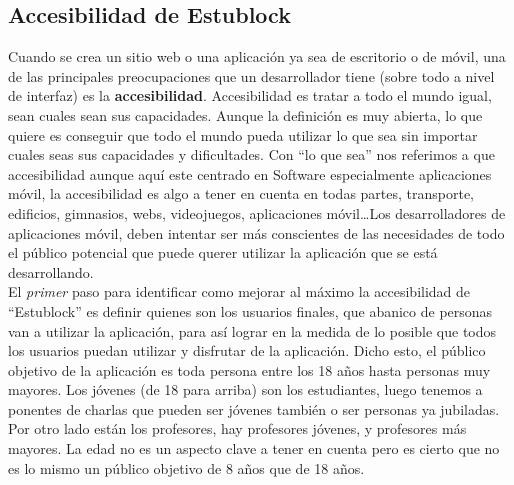 \subsection{Accesibilidad de Estublock}

Cuando se crea un sitio web o una aplicación ya sea de escritorio o de móvil, una de las principales preocupaciones que un desarrollador tiene (sobre todo a nivel de interfaz) es la \textbf{accesibilidad}. Accesibilidad es tratar a todo el mundo igual, sean cuales sean sus capacidades. Aunque la definición es muy abierta, lo que quiere es conseguir que todo el mundo pueda utilizar lo que sea sin importar cuales seas sus capacidades y dificultades. Con ``lo que sea'' nos referimos a que accesibilidad aunque aquí este centrado en Software especialmente aplicaciones móvil, la accesibilidad es algo a tener en cuenta en todas partes, transporte, edificios, gimnasios, webs, videojuegos, aplicaciones móvil\dots Los desarrolladores de aplicaciones móvil, deben intentar ser más conscientes de las necesidades de todo el público potencial que puede querer utilizar la aplicación que se está desarrollando. \\

El \emph{primer} paso para identificar como mejorar al máximo la accesibilidad de ``Estublock'' es definir quienes son los usuarios finales, que abanico de personas van a utilizar la aplicación, para así lograr en la medida de lo posible que todos los usuarios puedan utilizar y disfrutar de la aplicación. Dicho esto, el público objetivo de la aplicación es toda persona entre los 18 años hasta personas muy mayores. Los jóvenes (de 18 para arriba) son los estudiantes, luego tenemos a ponentes de charlas que pueden ser jóvenes también o ser personas ya jubiladas. Por otro lado están los profesores, hay profesores jóvenes, y profesores más mayores. La edad no es un aspecto clave a tener en cuenta pero es cierto que no es lo mismo un público objetivo de 8 años que de 18 años. \\

